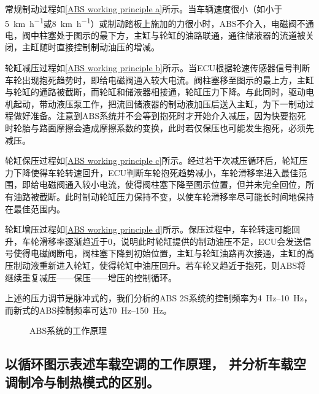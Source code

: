 \documentclass[UTF8]{ctexart}
\numberwithin{figure}{section}
\numberwithin{table}{section}
\begin{document}
常规制动过程如\cref{ABS working principle a}所示。当车辆速度很小（如小于\SI[per-mode = symbol]{5}{\km\per\hour}或\SI[per-mode = symbol]{8}{\km\per\hour}）或制动踏板上施加的力很小时，ABS不介入，电磁阀不通电，阀中柱塞处于图示的最下方，主缸与轮缸的油路联通，通往储液器的流道被关闭，主缸随时直接控制制动油压的增减。

轮缸减压过程如\cref{ABS working principle b}所示。当ECU根据轮速传感器信号判断车轮出现抱死趋势时，即给电磁阀通入较大电流。阀柱塞移至图示的最上方，主缸与轮缸的通路被截断，而轮缸和储液器相接通，轮缸压力下降。与此同时，驱动电机起动，带动液压泵工作，把流回储液器的制动液加压后送入主缸，为下一制动过程做好准备。注意到ABS系统并不会等到抱死时才开始介入减压，因为快要抱死时轮胎与路面摩擦会造成摩擦系数的变换，此时若仅保压也可能发生抱死，必须先减压。

轮缸保压过程如\cref{ABS working principle c}所示。经过若干次减压循环后，轮缸压力下降使得车轮转速回升，ECU判断车轮抱死趋势减小，车轮滑移率进入最佳范围，即给电磁阀通入较小电流，使得阀柱塞下降至图示位置，但并未完全回位，所有油路被截断。此时制动轮缸压力保持不变，以使车轮滑移率尽可能长时间地保持在最佳范围内。

轮缸增压过程如\cref{ABS working principle d}所示。保压过程中，车轮转速可能回升，车轮滑移率逐渐趋近于0，说明此时轮缸提供的制动油压不足，ECU会发送信号使得电磁阀断电，阀柱塞下降到初始位置，主缸与轮缸油路再次接通，主缸的高压制动液重新进入轮缸，使得轮缸中油压回升。若车轮又趋近于抱死，则ABS将继续重复减压——保压——增压的控制循环。

上述的压力调节是脉冲式的，我们分析的ABS 2S系统的控制频率为\qtyrange[range-phrase = $\,\sim\,$, range-units = single]{4}{10}{\Hz}，而新式的ABS控制频率可达\qtyrange[range-phrase = $\,\sim\,$, range-units = single]{70}{150}{\Hz}。

\begin{figure}[htbp]
	\centering
	\caption{ABS系统的工作原理}
	\label{ABS working principle}
\end{figure}

\subsection{以循环图示表述车载空调的工作原理， 并分析车载空调制冷与制热模式的区别。}
\end{document}
